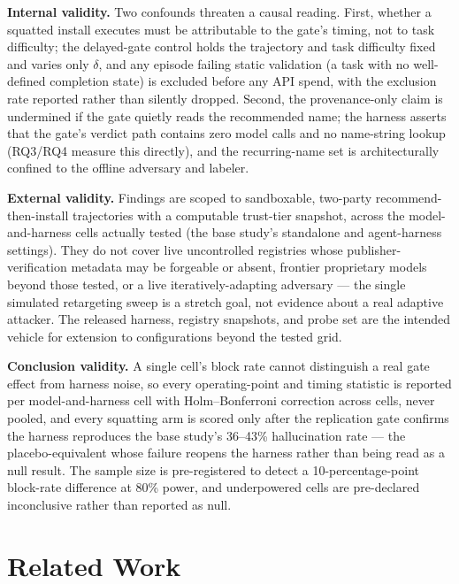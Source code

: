 \documentclass[11pt]{article}
\begin{document}
\textbf{Internal validity.} Two confounds threaten a causal reading. First, whether a squatted install executes must be attributable to the gate's timing, not to task difficulty; the delayed-gate control holds the trajectory and task difficulty fixed and varies only $\delta$, and any episode failing static validation (a task with no well-defined completion state) is excluded before any API spend, with the exclusion rate reported rather than silently dropped. Second, the provenance-only claim is undermined if the gate quietly reads the recommended name; the harness asserts that the gate's verdict path contains zero model calls and no name-string lookup (RQ3/RQ4 measure this directly), and the recurring-name set is architecturally confined to the offline adversary and labeler.

\textbf{External validity.} Findings are scoped to sandboxable, two-party recommend-then-install trajectories with a computable trust-tier snapshot, across the model-and-harness cells actually tested (the base study's standalone and agent-harness settings). They do not cover live uncontrolled registries whose publisher-verification metadata may be forgeable or absent, frontier proprietary models beyond those tested, or a live iteratively-adapting adversary --- the single simulated retargeting sweep is a stretch goal, not evidence about a real adaptive attacker. The released harness, registry snapshots, and probe set are the intended vehicle for extension to configurations beyond the tested grid.

\textbf{Conclusion validity.} A single cell's block rate cannot distinguish a real gate effect from harness noise, so every operating-point and timing statistic is reported per model-and-harness cell with Holm--Bonferroni correction across cells, never pooled, and every squatting arm is scored only after the replication gate confirms the harness reproduces the base study's 36--43\% hallucination rate --- the placebo-equivalent whose failure reopens the harness rather than being read as a null result. The sample size is pre-registered to detect a 10-percentage-point block-rate difference at 80\% power, and underpowered cells are pre-declared inconclusive rather than reported as null.

\section{Related Work}
\end{document}
